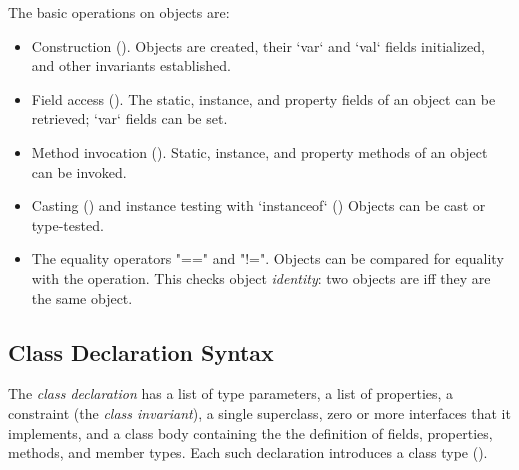 The basic operations on objects are:
\begin{itemize}

\item Construction ().  Objects are created, 
      their \xcd`var` and \xcd`val` fields initialized, and other invariants
      established.

\item Field access (). 
The static, instance, and property fields of an object can be retrieved; \xcd`var` fields
can be set.  

\item Method invocation ().  
Static, instance, and property methods of an object can be invoked.

\item Casting () and instance testing with \xcd`instanceof`
() Objects can be cast or type-tested.  

\item The equality operators \xcd"==" and \xcd"!=".  
Objects can be compared for equality with the \Xcd{==} operation.  This checks
object {\em identity}: two objects are \Xcd{==} iff they are the same object.

\end{itemize}

  

\subsection{Class Declaration Syntax}
\label{sect:ClassDeclSyntax}

The {\em class declaration} has a list of type parameters, a list of
properties, a constraint (the {\em class invariant}), a single superclass,
zero or more interfaces that it implements, and a class body containing the
the definition of fields, properties, methods, and member types. Each such
declaration introduces a class type ().

